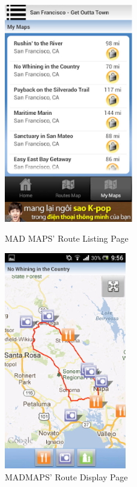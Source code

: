 \documentclass[a4paper,twoside,notitlepage,11pt]{article}
\begin{document}
\begin{figure}[!ht]
\centering
	\begin{minipage}{.49\textwidth}
		\begin{center}
			\includegraphics[width=0.5\textwidth]{images/mm-1.png}
			\caption{MAD MAPS' Route Listing Page}
		\end{center}
	\end{minipage}
	\begin{minipage}{.49\textwidth}
		\begin{center}
			\includegraphics[width=0.475\textwidth]{images/mm-2.png}
			\caption{MADMAPS' Route Display Page}
		\end{center}
	\end{minipage}
\end{figure}
\end{document}
